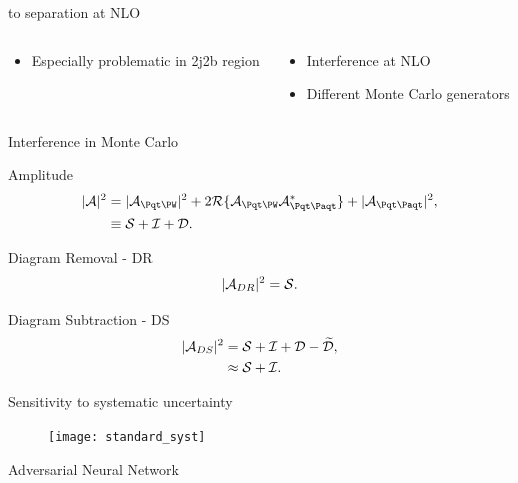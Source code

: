 \begin{frame}{\tW to \ttbar separation at NLO}
\begin{columns}
\begin{column}{0.45\textwidth}
\begin{itemize}
\item Especially problematic in 2j2b region
\end{itemize}
    \end{column}
    \quad
    \begin{column}{0.45\textwidth}
\begin{itemize}
\item Interference at NLO
\item Different Monte Carlo generators
\end{itemize}
    \end{column}
\quad
\end{columns}
\end{frame}

\begin{frame}{Interference in Monte Carlo}
\begin{block}{Amplitude}
\vspace{-0.3cm}
\begin{align*}
|\Aamp|^2 &= |\Atw|^2 + 2 \mathcal{R} \{ \Atw \Att^{\ast} \} + |\Att|^2, \\
&\equiv \Samp + \Iamp + \Damp.
\end{align*}
\end{block}
\begin{block}{Diagram Removal - DR}
\vspace{-0.3cm}
\begin{align*}
| \mathcal{A}_{DR} |^2 = \mathcal{S}.
\end{align*}
\end{block}
\begin{block}{Diagram Subtraction - DS}
\vspace{-0.3cm}
\begin{align*}
| \mathcal{A}_{DS} |^2 &= \mathcal{S} + \mathcal{I} + \mathcal{D} - \widetilde{\mathcal{D}},\\
&\approx \mathcal{S} + \mathcal{I}.
\end{align*}
\end{block}
\end{frame}

\begin{frame}{Sensitivity to systematic uncertainty}
\vspace{-0.2cm}
\begin{figure}
        \texttt{[image: standard\_syst]}
\end{figure}
\end{frame}

\begin{frame}[c]
\begin{center}
\Huge Adversarial Neural Network
\end{center}
\end{frame}

